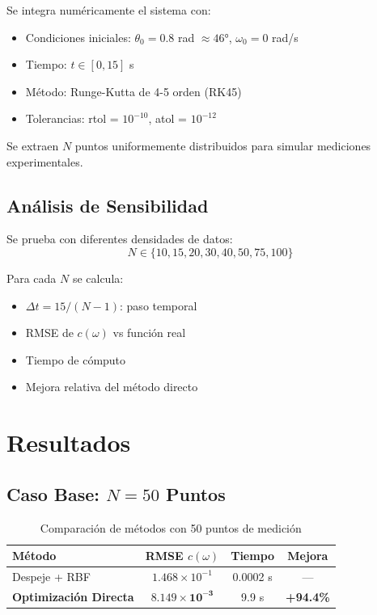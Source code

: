 \documentclass[11pt,a4paper]{article}
\begin{document}
Se integra numéricamente el sistema con:
\begin{itemize}
\item Condiciones iniciales: $\theta_0 = 0.8$ rad $\approx 46°$, $\omega_0 = 0$ rad/s
\item Tiempo: $t \in [0, 15]$ s
\item Método: Runge-Kutta de 4-5 orden (RK45)
\item Tolerancias: rtol = $10^{-10}$, atol = $10^{-12}$
\end{itemize}

Se extraen $N$ puntos uniformemente distribuidos para simular mediciones experimentales.

\subsection{Análisis de Sensibilidad}

Se prueba con diferentes densidades de datos:
\begin{equation*}
N \in \{10, 15, 20, 30, 40, 50, 75, 100\}
\end{equation*}

Para cada $N$ se calcula:
\begin{itemize}
\item $\Delta t = 15/(N-1)$: paso temporal
\item RMSE de $c(\omega)$ vs función real
\item Tiempo de cómputo
\item Mejora relativa del método directo
\end{itemize}

\section{Resultados}

\subsection{Caso Base: $N = 50$ Puntos}

\begin{table}[H]
\centering
\caption{Comparación de métodos con 50 puntos de medición}
\begin{tabular}{lccc}
\toprule
\textbf{Método} & \textbf{RMSE} $c(\omega)$ & \textbf{Tiempo} & \textbf{Mejora} \\
\midrule
Despeje + RBF & $1.468 \times 10^{-1}$ & 0.0002 s & --- \\
\rowcolor{green!20}
\textbf{Optimización Directa} & $\mathbf{8.149 \times 10^{-3}}$ & 9.9 s & \textbf{+94.4\%} \\
\bottomrule
\end{tabular}
\end{table}
\end{document}
